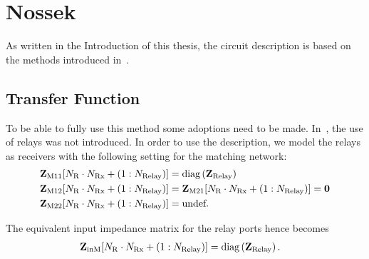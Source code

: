 \chapter{Nossek}
\label{sec:nossek}

As written in the Introduction of this thesis, the circuit description is based on the methods introduced in~\cite{Nossek}.

\section{Transfer Function}
To be able to fully use this method some adoptions need to be made.
In~\cite{Nossek}, the use of relays was not introduced.
In order to use the description, we model the relays as receivers with the following setting for the matching network:	
\begin{align}
\label{eq:nossek_matching}
\mat{Z}_\text{M11}[N_\text{R}\cdot N_\text{Rx}+\left(1:N_\text{Relay}\right)] &=
	\text{diag}\left(\vec{Z}_\text{Relay}\right)\\
\mat{Z}_\text{M12}[N_\text{R}\cdot N_\text{Rx}+\left(1:N_\text{Relay}\right)] &= 
	\mat{Z}_\text{M21}[N_\text{R}\cdot N_\text{Rx}+\left(1:N_\text{Relay}\right)] = \mat{0}\\
\mat{Z}_\text{M22}[N_\text{R}\cdot N_\text{Rx}+\left(1:N_\text{Relay}\right)] &= \text{undef.}%
\end{align}

The equivalent input impedance matrix for the relay ports hence becomes
\begin{align}
\label{eq:nossek_matching}
\mathbf{Z}_\text{inM}[N_\text{R}\cdot N_\text{Rx}+\left(1:N_\text{Relay}\right)] &= \text{diag}\left(\mathbf{Z}_\text{Relay}\right).
\end{align}
